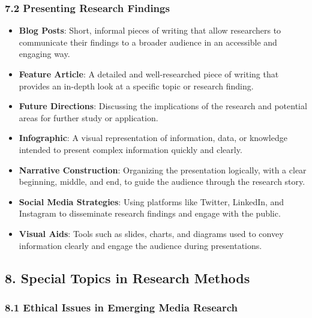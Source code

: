 \documentclass[
]{book}
\providecommand{\tightlist}{%
  \setlength{\itemsep}{0pt}\setlength{\parskip}{0pt}}
\begin{document}
\subsubsection*{\texorpdfstring{\textbf{7.2 Presenting Research Findings}}{7.2 Presenting Research Findings}}\label{presenting-research-findings}

\begin{itemize}
\tightlist
\item
  \textbf{Blog Posts}: Short, informal pieces of writing that allow researchers to communicate their findings to a broader audience in an accessible and engaging way.
\item
  \textbf{Feature Article}: A detailed and well-researched piece of writing that provides an in-depth look at a specific topic or research finding.
\item
  \textbf{Future Directions}: Discussing the implications of the research and potential areas for further study or application.
\item
  \textbf{Infographic}: A visual representation of information, data, or knowledge intended to present complex information quickly and clearly.
\item
  \textbf{Narrative Construction}: Organizing the presentation logically, with a clear beginning, middle, and end, to guide the audience through the research story.
\item
  \textbf{Social Media Strategies}: Using platforms like Twitter, LinkedIn, and Instagram to disseminate research findings and engage with the public.
\item
  \textbf{Visual Aids}: Tools such as slides, charts, and diagrams used to convey information clearly and engage the audience during presentations.
\end{itemize}

\subsection*{\texorpdfstring{8. \textbf{Special Topics in Research Methods}}{8. Special Topics in Research Methods}}\label{special-topics-in-research-methods-1}

\subsubsection*{\texorpdfstring{\textbf{8.1 Ethical Issues in Emerging Media Research}}{8.1 Ethical Issues in Emerging Media Research}}\label{ethical-issues-in-emerging-media-research}
\end{document}

